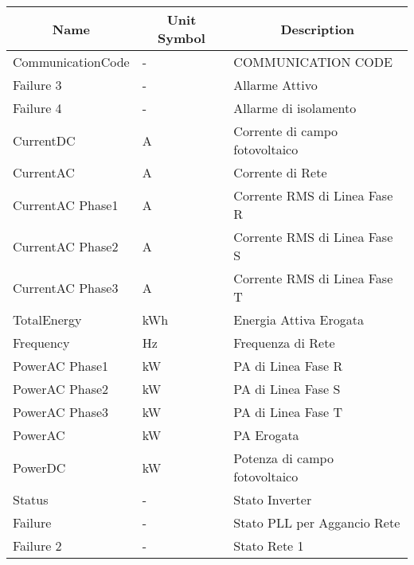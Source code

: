 \begin{table}[H]
	\begin{center}
		\begin{tabular}[c]{l|l|l}
			\hline
			\multicolumn{1}{c|}{\textbf{Name}}        &
			\multicolumn{1}{c|}{\textbf{Unit Symbol}} &
			\multicolumn{1}{c}{\textbf{Description}}                                         \\
			\hline
			CommunicationCode                         & -   & COMMUNICATION CODE             \\
			Failure 3                                 & -   & Allarme Attivo                 \\
			Failure 4                                 & -   & Allarme di isolamento          \\
			CurrentDC                                 & A   & Corrente di campo fotovoltaico \\
			CurrentAC                                 & A   & Corrente di Rete               \\
			CurrentAC Phase1                          & A   & Corrente RMS di Linea Fase R   \\
			CurrentAC Phase2                          & A   & Corrente RMS di Linea Fase S   \\
			CurrentAC Phase3                          & A   & Corrente RMS di Linea Fase T   \\
			TotalEnergy                               & kWh & Energia Attiva Erogata         \\
			Frequency                                 & Hz  & Frequenza di Rete              \\
			PowerAC Phase1                            & kW  & PA di Linea Fase R             \\
			PowerAC Phase2                            & kW  & PA di Linea Fase S             \\
			PowerAC Phase3                            & kW  & PA di Linea Fase T             \\
			PowerAC                                   & kW  & PA Erogata                     \\
			PowerDC                                   & kW  & Potenza di campo fotovoltaico  \\
			Status                                    & -   & Stato Inverter                 \\
			Failure                                   & -   & Stato PLL per Aggancio Rete    \\
			Failure 2                                 & -   & Stato Rete 1                   \\

\end{tabular}
\end{center}
\end{table}
